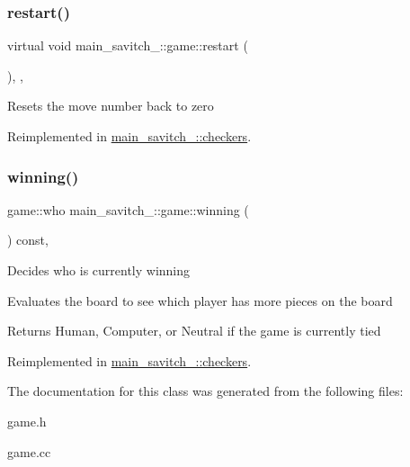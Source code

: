 \subsubsection{\texorpdfstring{restart()}{restart()}}
{\footnotesize\ttfamily virtual void main\+\_\+savitch\+\_\+::game\+::restart (\begin{DoxyParamCaption}{ }\end{DoxyParamCaption})\hspace{0.3cm}{\ttfamily [inline]}, {\ttfamily [protected]}, {\ttfamily [virtual]}}

Resets the move number back to zero 

Reimplemented in \hyperlink{classmain__savitch__14_1_1checkers_ad3ee0adbdabda9136ecd46b958c83d24}{main\+\_\+savitch\+\_\+::checkers}.

\mbox{\label{classmain__savitch__14_1_1game_a2f0d5338c12bd98d52fe2383ece5c45e}} 
\subsubsection{\texorpdfstring{winning()}{winning()}}
{\footnotesize\ttfamily game\+::who main\+\_\+savitch\+\_\+::game\+::winning (\begin{DoxyParamCaption}{ }\end{DoxyParamCaption}) const\hspace{0.3cm}{\ttfamily [protected]}, {\ttfamily [virtual]}}

Decides who is currently winning

Evaluates the board to see which player has more pieces on the board \begin{DoxyReturn}{Returns}
Human, Computer, or Neutral if the game is currently tied 
\end{DoxyReturn}


Reimplemented in \hyperlink{classmain__savitch__14_1_1checkers_aad9a08662e9fdf62752c60997b29370e}{main\+\_\+savitch\+\_\+::checkers}.



The documentation for this class was generated from the following files\+:\begin{DoxyCompactItemize}
\item 
game.\+h\item 
game.\+cc\end{DoxyCompactItemize}
